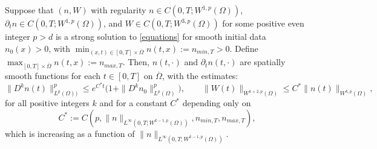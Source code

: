 \documentclass[10pt,a4paper]{amsart}
\begin{document}
\begin{proposition}\label{regularity}
Suppose that $(n, W)$ with regularity $n \in C(0, T; W^{1, p}(\Omega))$, $\partial_{t}n \in C(0, T; W^{1, p}(\Omega))$, and $W \in C(0, T; W^{3, p}(\Omega))$ for some positive even integer $p > d$ is a strong solution to \eqref{equations} for smooth initial data $n_{0}(x) > 0$, with $\min_{(x, t) \in [0, T] \times \overline{\Omega}} n(t, x) := n_{min, T} > 0$. Define $\max_{[0, T] \times \overline{\Omega}} n(t, x) := n_{max, T}$. Then, $n(t, \cdot)$ and $\partial_{t}n(t, \cdot)$ are spatially smooth functions for each $t \in [0, T]$ on $\overline{\Omega}$, with the estimates:
\begin{equation*}
\|D^{k}n(t)\|_{L^{p}(\Omega))}^{p} \le e^{C^{*}t}\Big(1 + \|D^{k}n_{0}\|_{L^{p}(\Omega)}^{p}\Big), \qquad \|W(t)\|_{W^{k + 2, p}(\Omega)} \le C^{*}\|n(t)\|_{W^{k, p}(\Omega)},
\end{equation*}
for all positive integers $k$ and for a constant $C^{*}$ depending only on $$C^{*} := C(p, \|n\|_{L^{\infty}(0, T; W^{k - 1, p}(\Omega))}, n_{min, T}, n_{max, T}),$$ which is increasing as a function of $\|n\|_{L^{\infty}(0, T; W^{k - 1, p}(\Omega))}$.
\end{proposition}
\end{document}
